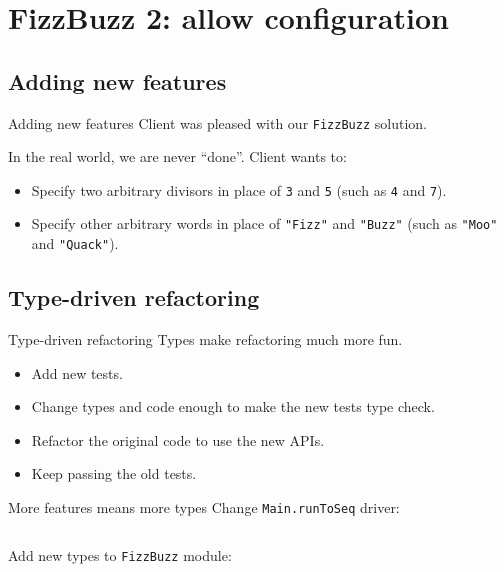 \section{FizzBuzz 2: allow configuration}

\subsection{Adding new features}

\begin{frame}{Adding new features}
  Client was pleased with our \texttt{FizzBuzz} solution.

  In the real world, we are never ``done''. Client wants to:
  \begin{itemize}
  \item Specify two \alert{arbitrary} divisors in place of \texttt{3} and \texttt{5} (such as \texttt{4} and \texttt{7}).
  \item Specify other \alert{arbitrary} words in place of \texttt{"Fizz"} and \texttt{"Buzz"} (such as \texttt{"Moo"} and \texttt{"Quack"}).
  \end{itemize}
\end{frame}

\subsection{Type-driven refactoring}

\begin{frame}{Type-driven refactoring}
  Types make refactoring much more fun.

  \begin{itemize}
  \item Add \alert{new} tests.
  \item Change types and code enough to make the new tests \alert{type check}.
  \item \alert{Refactor} the original code to use the new APIs.
  \item Keep passing the \alert{old} tests.
  \end{itemize}
\end{frame}

\begin{frame}[fragile]{More features means more types}
  Change \texttt{Main.runToSeq} driver:
  \inputminted[gobble=2]{scala}{Main5.scala}

  Add new types to \texttt{FizzBuzz} module:
  \inputminted[gobble=2]{scala}{FizzBuzz3.scala}
\end{frame}

